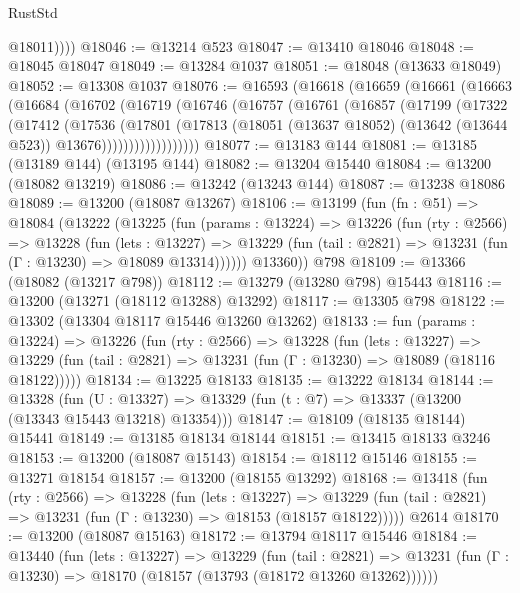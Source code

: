 \begin{lexlean}{RustStd}
\begin{coremodule}
            @18011))))
@18046 := @13214 @523
@18047 := @13410 @18046
@18048 := @18045 @18047
@18049 := @13284 @1037
@18051 := @18048 (@13633 @18049)
@18052 := @13308 @1037
@18076 := @16593
    (@16618
      (@16659
        (@16661
          (@16663
            (@16684
              (@16702
                (@16719
                  (@16746
                    (@16757
                      (@16761
                        (@16857
                          (@17199
                            (@17322
                              (@17412
                                (@17536
                                  (@17801
                                    (@17813
                                      (@18051
                                        (@13637 @18052)
                                        (@13642 (@13644 @523))
                                        @13676))))))))))))))))))
@18077 := @13183 @144
@18081 := @13185 (@13189 @144) (@13195 @144)
@18082 := @13204 @15440
@18084 := @13200 (@18082 @13219)
@18086 := @13242 (@13243 @144)
@18087 := @13238 @18086
@18089 := @13200 (@18087 @13267)
@18106 := @13199
    (fun (fn : @51) =>
    @18084
      (@13222
        (@13225
          (fun (params : @13224) =>
          @13226
            (fun (rty : @2566) =>
            @13228
              (fun (lets : @13227) =>
              @13229 (fun (tail : @2821) => @13231 (fun (Γ : @13230) => @18089 @13314))))))
        @13360))
    @798
@18109 := @13366 (@18082 (@13217 @798))
@18112 := @13279 (@13280 @798) @15443
@18116 := @13200 (@13271 (@18112 @13288) @13292)
@18117 := @13305 @798
@18122 := @13302 (@13304 @18117 @15446 @13260 @13262)
@18133 := fun (params : @13224) =>
  @13226
    (fun (rty : @2566) =>
    @13228
      (fun (lets : @13227) =>
      @13229 (fun (tail : @2821) => @13231 (fun (Γ : @13230) => @18089 (@18116 @18122)))))
@18134 := @13225 @18133
@18135 := @13222 @18134
@18144 := @13328
    (fun (U : @13327) => @13329 (fun (t : @7) => @13337 (@13200 (@13343 @15443 @13218) @13354)))
@18147 := @18109 (@18135 @18144) @15441
@18149 := @13185 @18134 @18144
@18151 := @13415 @18133 @3246
@18153 := @13200 (@18087 @15143)
@18154 := @18112 @15146
@18155 := @13271 @18154
@18157 := @13200 (@18155 @13292)
@18168 := @13418
    (fun (rty : @2566) =>
    @13228
      (fun (lets : @13227) =>
      @13229 (fun (tail : @2821) => @13231 (fun (Γ : @13230) => @18153 (@18157 @18122)))))
    @2614
@18170 := @13200 (@18087 @15163)
@18172 := @13794 @18117 @15446
@18184 := @13440
    (fun (lets : @13227) =>
    @13229
      (fun (tail : @2821) =>
      @13231 (fun (Γ : @13230) => @18170 (@18157 (@13793 (@18172 @13260 @13262))))))

\end{coremodule}
\end{lexlean}
